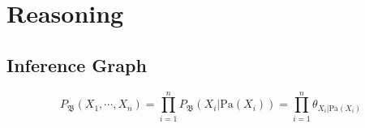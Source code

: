 \section{Reasoning}
\label{sec-reasoning}

\par


\subsection{Inference Graph}
%

\begin{equation}\label{eq:BNOri}
P_\mathfrak{B}(X_1, \cdots, X_n) = 
\prod_{i=1}^{n} P_\mathfrak{B}(X_i| \text{Pa}{(X_i)})=
\prod_{i=1}^{n} \theta_{X_i | \text{Pa}(X_i)}
\end{equation}
\vspace{-1ex}

